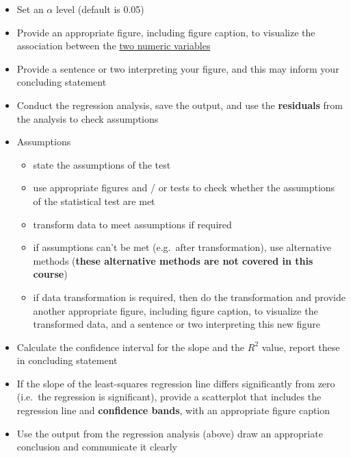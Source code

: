 \documentclass[
]{book}
\providecommand{\tightlist}{%
  \setlength{\itemsep}{0pt}\setlength{\parskip}{0pt}}
\begin{document}
\begin{itemize}
\tightlist
\item
  Set an \(\alpha\) level (default is 0.05)\\
\item
  Provide an appropriate figure, including figure caption, to visualize the association between the \hyperref[two_numeric]{two numeric variables}
\item
  Provide a sentence or two interpreting your figure, and this may inform your concluding statement\\
\item
  Conduct the regression analysis, save the output, and use the \textbf{residuals} from the analysis to check assumptions\\
\item
  Assumptions

  \begin{itemize}
  \tightlist
  \item
    state the assumptions of the test\\
  \item
    use appropriate figures and / or tests to check whether the assumptions of the statistical test are met
  \item
    transform data to meet assumptions if required
  \item
    if assumptions can't be met (e.g.~after transformation), use alternative methods (\textbf{these alternative methods are not covered in this course})
  \item
    if data transformation is required, then do the transformation and provide another appropriate figure, including figure caption, to visualize the transformed data, and a sentence or two interpreting this new figure\\
  \end{itemize}
\item
  Calculate the confidence interval for the slope and the \(R^2\) value, report these in concluding statement\\
\item
  If the slope of the least-squares regression line differs significantly from zero (i.e.~the regression is significant), provide a scatterplot that includes the regression line and \textbf{confidence bands}, with an appropriate figure caption\\
\item
  Use the output from the regression analysis (above) draw an appropriate conclusion and communicate it clearly
\end{itemize}
\end{document}
